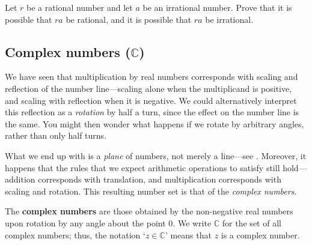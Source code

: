 \begin{exercise}
Let $r$ be a rational number and let $a$ be an irrational number. Prove that it is possible that $ra$ be rational, and it is possible that $ra$ be irrational.
\end{exercise}

\subsection*{Complex numbers ($\mathbb{C}$)}

We have seen that multiplication by real numbers corresponds with scaling and reflection of the number line---scaling alone when the multiplicand is positive, and scaling with reflection when it is negative. We could alternatively interpret this reflection as a \textit{rotation} by half a turn, since the effect on the number line is the same. You might then wonder what happens if we rotate by arbitrary angles, rather than only half turns.

What we end up with is a \textit{plane} of numbers, not merely a line---see . Moreover, it happens that the rules that we expect arithmetic operations to satisfy still hold---addition corresponds with translation, and multiplication corresponds with scaling and rotation. This resulting number set is that of the \textit{complex numbers}.

\begin{definition}
\label{defComplexNumbersInformal}
The \textbf{complex numbers} are those obtained by the non-negative real numbers upon rotation by any angle about the point $0$. We write $\mathbb{C}$  for the set of all complex numbers; thus, the notation `$z \in \mathbb{C}$' means that $z$ is a complex number.
\end{definition}

